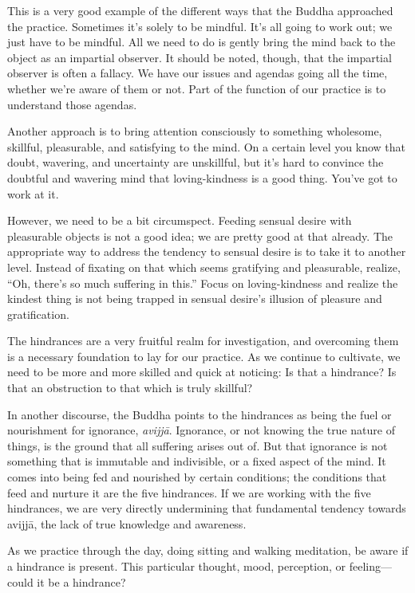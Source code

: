 This is a very good example of the different ways that the Buddha
approached the practice. Sometimes it’s solely to be mindful. It’s all
going to work out; we just have to be mindful. All we need to do is
gently bring the mind back to the object as an impartial observer. It
should be noted, though, that the impartial observer is often a fallacy.
We have our issues and agendas going all the time, whether we’re aware
of them or not. Part of the function of our practice is to understand
those agendas.

Another approach is to bring attention consciously to something
wholesome, skillful, pleasurable, and satisfying to the mind. On a
certain level you know that doubt, wavering, and uncertainty are
unskillful, but it’s hard to convince the doubtful and wavering mind
that loving-kindness is a good thing. You’ve got to work at it.

However, we need to be a bit circumspect. Feeding sensual desire with
pleasurable objects is not a good idea; we are pretty good at that
already. The appropriate way to address the tendency to sensual desire
is to take it to another level. Instead of fixating on that which seems
gratifying and pleasurable, realize, “Oh, there’s so much suffering in
this.” Focus on loving-kindness and realize the kindest thing is not
being trapped in sensual desire’s illusion of pleasure and
gratification.

The hindrances are a very fruitful realm for investigation, and
overcoming them is a necessary foundation to lay for our practice. As we
continue to cultivate, we need to be more and more skilled and quick at
noticing: Is that a hindrance? Is that an obstruction to that which is
truly skillful?

In another discourse, the Buddha points to the hindrances as being the
fuel or nourishment for ignorance, \emph{avijjā}. Ignorance, or not
knowing the true nature of things, is the ground that all suffering
arises out of. But that ignorance is not something that is immutable and
indivisible, or a fixed aspect of the mind. It comes into being fed and
nourished by certain conditions; the conditions that feed and nurture it
are the five hindrances. If we are working with the five hindrances, we
are very directly undermining that fundamental tendency towards avijjā,
the lack of true knowledge and awareness.

As we practice through the day, doing sitting and walking meditation, be
aware if a hindrance is present. This particular thought, mood,
perception, or feeling—could it be a hindrance?

